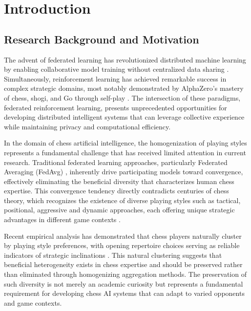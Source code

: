 \chapter{Introduction}
\label{ch:introduction}

\section{Research Background and Motivation}
\label{sec:background}

The advent of federated learning has revolutionized distributed machine learning by enabling collaborative model training without centralized data sharing \cite{mcmahan2017fedavg}. Simultaneously, reinforcement learning has achieved remarkable success in complex strategic domains, most notably demonstrated by AlphaZero's mastery of chess, shogi, and Go through self-play \cite{silver2017mastering}. The intersection of these paradigms, federated reinforcement learning, presents unprecedented opportunities for developing distributed intelligent systems that can leverage collective experience while maintaining privacy and computational efficiency.

In the domain of chess artificial intelligence, the homogenization of playing styles represents a fundamental challenge that has received limited attention in current research. Traditional federated learning approaches, particularly Federated Averaging (FedAvg) \cite{mcmahan2017fedavg}, inherently drive participating models toward convergence, effectively eliminating the beneficial diversity that characterizes human chess expertise. This convergence tendency directly contradicts centuries of chess theory, which recognizes the existence of diverse playing styles such as tactical, positional, aggressive and dynamic approaches, each offering unique strategic advantages in different game contexts \cite{matanovic1974encyclopedia}.

Recent empirical analysis has demonstrated that chess players naturally cluster by playing style preferences, with opening repertoire choices serving as reliable indicators of strategic inclinations \cite{demarzo2022quantifying}. This natural clustering suggests that beneficial heterogeneity exists in chess expertise and should be preserved rather than eliminated through homogenizing aggregation methods. The preservation of such diversity is not merely an academic curiosity but represents a fundamental requirement for developing chess AI systems that can adapt to varied opponents and game contexts.

